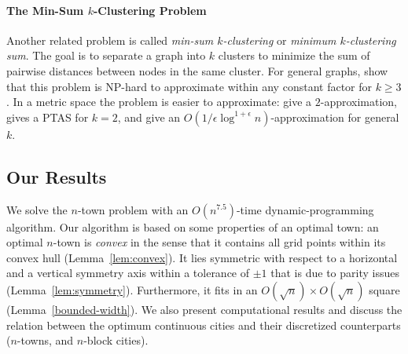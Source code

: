 \documentclass[preprint,authoryear,12pt]{elsarticle}
\begin{document}
\paragraph{The Min-Sum $k$-Clustering Problem}
Another related problem is called \emph{min-sum $k$-clustering} or
\emph{minimum $k$-clustering sum}. The goal is to separate a graph
into $k$ clusters to minimize the sum of pairwise distances between
nodes in the same cluster.  For general graphs,
\cite{sahni76} show that this problem is NP-hard to approximate
within any constant factor for $k\geq 3$. In a metric space the
problem is easier to approximate:
\cite{guttmannbeck98} give a $2$-approximation,
\cite{indyk99} gives a PTAS for $k=2$, and
\cite{bartal01} give an
$O(1/\epsilon\log^{1+\epsilon}n)$-approximation for general $k$.


\subsection{Our Results} We solve the $n$-town problem with an
$O(n^{7.5})$-time dynamic-programming algorithm.
Our algorithm is based on some properties of an optimal town:
an optimal $n$-town is \emph{convex} in the sense that it contains
all grid points within its convex hull (Lemma~\ref{lem:convex}).
It lies symmetric with respect to a horizontal and a vertical
symmetry axis within a tolerance of $\pm1$ that is due to parity
issues
 (Lemma~\ref{lem:symmetry}).
Furthermore, it fits in an $O(\sqrt n)\times O(\sqrt n)$ square
 (Lemma~\ref{bounded-width}).
 We also present
computational results and discuss the relation between
the optimum continuous cities and their discretized counterparts
($n$-towns, and $n$-block cities).
\end{document}
